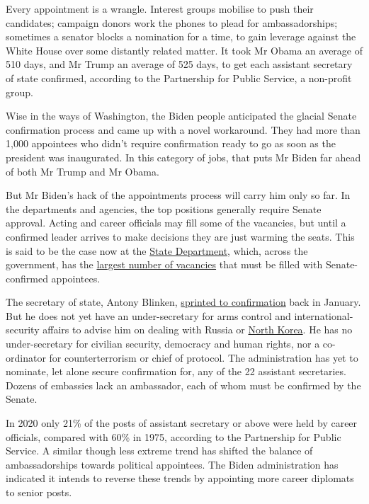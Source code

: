 \documentclass{article}
\begin{document}
Every appointment is a wrangle. Interest groups mobilise to push their candidates; campaign donors work the phones to plead for ambassadorships; sometimes a senator blocks a nomination for a time, to gain leverage against the White House over some distantly related matter. It took Mr Obama an average of 510 days, and Mr Trump an average of 525 days, to get each assistant secretary of state confirmed, according to the Partnership for Public Service, a non-profit group. 

Wise in the ways of Washington, the Biden people anticipated the glacial Senate confirmation process and came up with a novel workaround. They had more than 1,000 appointees who didn't require confirmation ready to go as soon as the president was inaugurated. In this category of jobs, that puts Mr Biden far ahead of both Mr Trump and Mr Obama. 

But Mr Biden's hack of the appointments process will carry him only so far. In the departments and agencies, the top positions generally require Senate approval. Acting and career officials may fill some of the vacancies, but until a confirmed leader arrives to make decisions they are just warming the seats. This is said to be the case now at the \href{/united-states/2020/11/21/two-new-reports-provide-a-road-map-for-reforming-american-diplomacy}{State Department}, which, across the government, has the \href{/international/2020/08/13/the-dereliction-of-american-diplomacy}{largest number of vacancies} that must be filled with Senate-confirmed appointees. 

The secretary of state, Antony Blinken, \href{/united-states/2021/01/23/back-to-the-future}{sprinted to confirmation} back in January. But he does not yet have an under-secretary for arms control and international-security affairs to advise him on dealing with Russia or \href{/asia/2021/01/09/is-north-koreas-dictator-losing-his-touch}{North Korea}. He has no under-secretary for civilian security, democracy and human rights, nor a co-ordinator for counterterrorism or chief of protocol. The administration has yet to nominate, let alone secure confirmation for, any of the 22 assistant secretaries. Dozens of embassies lack an ambassador, each of whom must be confirmed by the Senate. 

In 2020 only 21\% of the posts of assistant secretary or above were held by career officials, compared with 60\% in 1975, according to the Partnership for Public Service. A similar though less extreme trend has shifted the balance of ambassadorships towards political appointees. The Biden administration has indicated it intends to reverse these trends by appointing more career diplomats to senior posts. 
\end{document}
